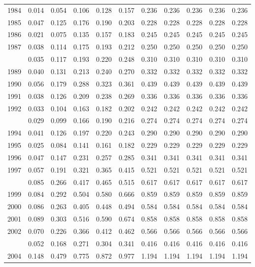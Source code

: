 \documentclass[
]{article}
\begin{document}
\begin{longtable}[t]{lrrrrrrrrrr}
1984 & 0.014 & 0.054 & 0.106 & 0.128 & 0.157 & 0.236 & 0.236 & 0.236 & 0.236 & 0.236\\
1985 & 0.047 & 0.125 & 0.176 & 0.190 & 0.203 & 0.228 & 0.228 & 0.228 & 0.228 & 0.228\\
1986 & 0.021 & 0.075 & 0.135 & 0.157 & 0.183 & 0.245 & 0.245 & 0.245 & 0.245 & 0.245\\
1987 & 0.038 & 0.114 & 0.175 & 0.193 & 0.212 & 0.250 & 0.250 & 0.250 & 0.250 & 0.250\\
\addlinespace
1988 & 0.035 & 0.117 & 0.193 & 0.220 & 0.248 & 0.310 & 0.310 & 0.310 & 0.310 & 0.310\\
1989 & 0.040 & 0.131 & 0.213 & 0.240 & 0.270 & 0.332 & 0.332 & 0.332 & 0.332 & 0.332\\
1990 & 0.056 & 0.179 & 0.288 & 0.323 & 0.361 & 0.439 & 0.439 & 0.439 & 0.439 & 0.439\\
1991 & 0.038 & 0.126 & 0.209 & 0.238 & 0.269 & 0.336 & 0.336 & 0.336 & 0.336 & 0.336\\
1992 & 0.033 & 0.104 & 0.163 & 0.182 & 0.202 & 0.242 & 0.242 & 0.242 & 0.242 & 0.242\\
\addlinespace
1993 & 0.029 & 0.099 & 0.166 & 0.190 & 0.216 & 0.274 & 0.274 & 0.274 & 0.274 & 0.274\\
1994 & 0.041 & 0.126 & 0.197 & 0.220 & 0.243 & 0.290 & 0.290 & 0.290 & 0.290 & 0.290\\
1995 & 0.025 & 0.084 & 0.141 & 0.161 & 0.182 & 0.229 & 0.229 & 0.229 & 0.229 & 0.229\\
1996 & 0.047 & 0.147 & 0.231 & 0.257 & 0.285 & 0.341 & 0.341 & 0.341 & 0.341 & 0.341\\
1997 & 0.057 & 0.191 & 0.321 & 0.365 & 0.415 & 0.521 & 0.521 & 0.521 & 0.521 & 0.521\\
\addlinespace
1998 & 0.085 & 0.266 & 0.417 & 0.465 & 0.515 & 0.617 & 0.617 & 0.617 & 0.617 & 0.617\\
1999 & 0.084 & 0.292 & 0.504 & 0.580 & 0.666 & 0.859 & 0.859 & 0.859 & 0.859 & 0.859\\
2000 & 0.086 & 0.263 & 0.405 & 0.448 & 0.494 & 0.584 & 0.584 & 0.584 & 0.584 & 0.584\\
2001 & 0.089 & 0.303 & 0.516 & 0.590 & 0.674 & 0.858 & 0.858 & 0.858 & 0.858 & 0.858\\
2002 & 0.070 & 0.226 & 0.366 & 0.412 & 0.462 & 0.566 & 0.566 & 0.566 & 0.566 & 0.566\\
\addlinespace
2003 & 0.052 & 0.168 & 0.271 & 0.304 & 0.341 & 0.416 & 0.416 & 0.416 & 0.416 & 0.416\\
2004 & 0.148 & 0.479 & 0.775 & 0.872 & 0.977 & 1.194 & 1.194 & 1.194 & 1.194 & 1.194\\

\end{longtable}
\end{document}

